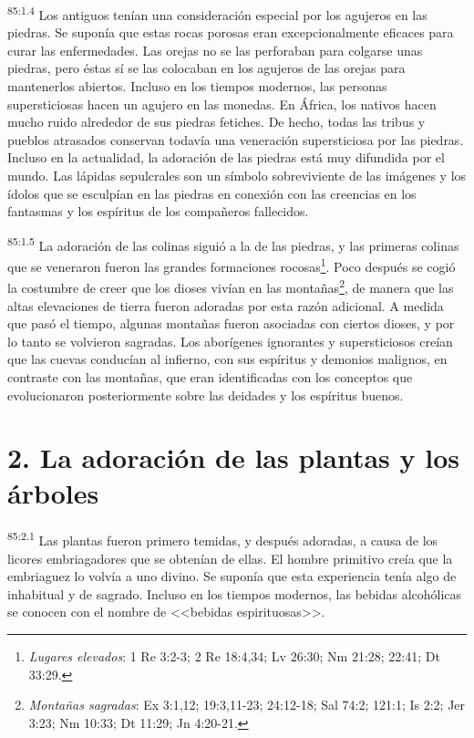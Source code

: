 \documentclass[twoside, 11pt]{book}
\begin{document}
\par
\textsuperscript{85:1.4} Los antiguos tenían una consideración especial por los agujeros en las piedras. Se suponía que estas rocas porosas eran excepcionalmente eficaces para curar las enfermedades. Las orejas no se las perforaban para colgarse unas piedras, pero éstas sí se las colocaban en los agujeros de las orejas para mantenerlos abiertos. Incluso en los tiempos modernos, las personas supersticiosas hacen un agujero en las monedas. En África, los nativos hacen mucho ruido alrededor de sus piedras fetiches. De hecho, todas las tribus y pueblos atrasados conservan todavía una veneración supersticiosa por las piedras. Incluso en la actualidad, la adoración de las piedras está muy difundida por el mundo. Las lápidas sepulcrales son un símbolo sobreviviente de las imágenes y los ídolos que se esculpían en las piedras en conexión con las creencias en los fantasmas y los espíritus de los compañeros fallecidos.

\par
\textsuperscript{85:1.5} La adoración de las colinas siguió a la de las piedras, y las primeras colinas que se veneraron fueron las grandes formaciones rocosas\footnote{\textit{Lugares elevados}: 1 Re 3:2-3; 2 Re 18:4,34; Lv 26:30; Nm 21:28; 22:41; Dt 33:29.}. Poco después se cogió la costumbre de creer que los dioses vivían en las montañas\footnote{\textit{Montañas sagradas}: Ex 3:1,12; 19:3,11-23; 24:12-18; Sal 74:2; 121:1; Is 2:2; Jer 3:23; Nm 10:33; Dt 11:29; Jn 4:20-21.}, de manera que las altas elevaciones de tierra fueron adoradas por esta razón adicional. A medida que pasó el tiempo, algunas montañas fueron asociadas con ciertos dioses, y por lo tanto se volvieron sagradas. Los aborígenes ignorantes y supersticiosos creían que las cuevas conducían al infierno, con sus espíritus y demonios malignos, en contraste con las montañas, que eran identificadas con los conceptos que evolucionaron posteriormente sobre las deidades y los espíritus buenos.

\section*{2. La adoración de las plantas y los árboles}
\par
\textsuperscript{85:2.1} Las plantas fueron primero temidas, y después adoradas, a causa de los licores embriagadores que se obtenían de ellas. El hombre primitivo creía que la embriaguez lo volvía a uno divino. Se suponía que esta experiencia tenía algo de inhabitual y de sagrado. Incluso en los tiempos modernos, las bebidas alcohólicas se conocen con el nombre de <<bebidas espirituosas>>.
\end{document}
